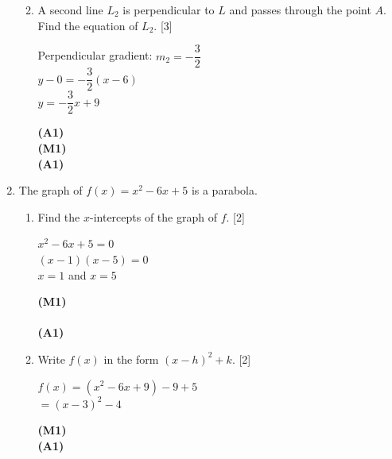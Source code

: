 \documentclass[12pt, twoside]{article}
\begin{document}
\begin{enumerate}[itemsep=0.2cm]
\begin{enumerate}[itemsep=0.3cm]
  \medskip
  \item A second line $L_2$ is perpendicular to $L$ and passes through the
        point $A$. Find the equation of $L_2$. \hfill [3]

  \begin{minipage}[t]{0.62\textwidth}
  Perpendicular gradient: $m_2 = -\dfrac{3}{2}$\\[0.2cm]
  $y - 0 = -\dfrac{3}{2}(x - 6)$\\[0.15cm]
  $y = -\dfrac{3}{2}x + 9$
  \end{minipage}%
  \begin{minipage}[t]{0.35\textwidth}\raggedleft
  \textbf{(A1)}\\[0.2cm]
  \textbf{(M1)}\\[0.15cm]
  \textbf{(A1)}
  \end{minipage}
\end{enumerate}

\newpage

\item The graph of $f(x) = x^2 - 6x + 5$ is a parabola.

\begin{enumerate}[itemsep=0.3cm]
  \item Find the $x$-intercepts of the graph of $f$. \hfill [2]

  \begin{minipage}[t]{0.62\textwidth}
  $x^2 - 6x + 5 = 0$\\[0.15cm]
  $(x - 1)(x - 5) = 0$\\[0.15cm]
  $x = 1$ and $x = 5$
  \end{minipage}%
  \begin{minipage}[t]{0.35\textwidth}\raggedleft
  \textbf{(M1)}\\[0.15cm]
  ~\\[0.15cm]
  \textbf{(A1)}
  \end{minipage}

  \medskip
  \item Write $f(x)$ in the form $(x - h)^2 + k$. \hfill [2]

  \begin{minipage}[t]{0.62\textwidth}
  $f(x) = (x^2 - 6x + 9) - 9 + 5$\\[0.15cm]
  $= (x - 3)^2 - 4$
  \end{minipage}%
  \begin{minipage}[t]{0.35\textwidth}\raggedleft
  \textbf{(M1)}\\[0.15cm]
  \textbf{(A1)}
  \end{minipage}


\end{enumerate}
\end{enumerate}
\end{document}
